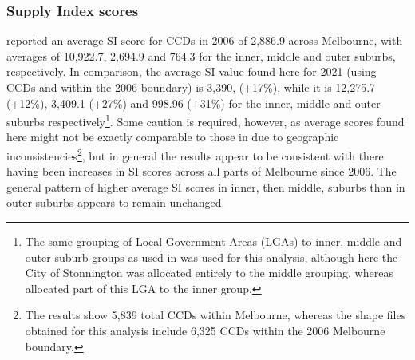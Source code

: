 \documentclass[preprint, 3p,
authoryear]{elsarticle} %
\begin{document}
\subsubsection{Supply Index scores}\label{supply-index-scores}

\citet{currie2010identifying} reported an average SI score for CCDs in
2006 of 2,886.9 across Melbourne, with averages of 10,922.7, 2,694.9 and
764.3 for the inner, middle and outer suburbs, respectively. In
comparison, the average SI value found here for 2021 (using CCDs and
within the 2006 boundary) is 3,390, (+17\%), while it is 12,275.7
(+12\%), 3,409.1 (+27\%) and 998.96 (+31\%) for the inner, middle and
outer suburbs respectively\footnote{The same grouping of Local
  Government Areas (LGAs) to inner, middle and outer suburb groups as
  used in \citet{currie2010identifying} was used for this analysis,
  although here the City of Stonnington was allocated entirely to the
  middle grouping, whereas \citet{currie2010identifying} allocated part
  of this LGA to the inner group.}. Some caution is required, however,
as average scores found here might not be exactly comparable to those in
\citet{currie2010identifying} due to geographic
inconsistencies\footnote{The \citet{currie2010identifying} results show
  5,839 total CCDs within Melbourne, whereas the shape files obtained
  for this analysis include 6,325 CCDs within the 2006 Melbourne
  boundary.}, but in general the results appear to be consistent with
there having been increases in SI scores across all parts of Melbourne
since 2006. The general pattern of higher average SI scores in inner,
then middle, suburbs than in outer suburbs appears to remain unchanged.
\end{document}
